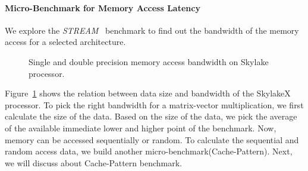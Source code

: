 \documentclass[conference, 10ppt]{IEEEtran}
\begin{document}
\paragraph{Micro-Benchmark for Memory Access Latency}
We explore the \textit{STREAM}~\cite{mccalpin1995stream} benchmark to find out the bandwidth of the memory access for a selected architecture.
\begin{figure}[hbt!]
	\centering
	\caption{Single and double precision memory access bandwidth on Skylake processor.}
	\label{fig:stream-copy-bandwidth}
\end{figure}
Figure~\ref{fig:stream-copy-bandwidth} shows the relation between data size and bandwidth of the SkylakeX processor. 
To pick the right bandwidth for a matrix-vector multiplication, we first calculate the size of the data. Based on the size 
of the data, we pick the average of the available immediate lower and higher point of the benchmark. Now, memory can 
be accessed sequentially or random. To calculate the sequential and random access data, we build another micro-benchmark(Cache-Pattern). 
Next, we will discuss about Cache-Pattern benchmark.
 
\end{document}
